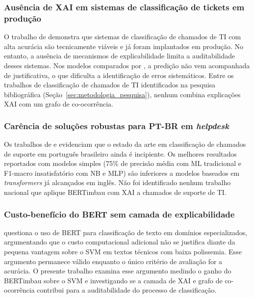 \documentclass[
    12pt,                %
    openright,           %
    oneside,             %
    a4paper,             %
    english,             %
    brazil               %
]{abntex2}
\begin{document}
\subsubsection{Ausência de XAI em sistemas de classificação de tickets em produção}
\label{subsubsec:lacuna_xai}

O trabalho de  demonstra que sistemas de classificação de chamados de TI 
com alta acurácia são tecnicamente viáveis e já foram implantados em produção. No entanto, a 
ausência de mecanismos de explicabilidade limita a auditabilidade desses sistemas. 
Nos modelos comparados por , a predição não vem acompanhada de justificativa, o que dificulta a identificação de erros sistemáticos. Entre os trabalhos de classificação de chamados de TI identificados na pesquisa bibliográfica (Seção~\ref{sec:metodologia_pesquisa}), nenhum combina explicações XAI com um grafo de co-ocorrência.

\subsubsection{Carência de soluções robustas para PT-BR em \textit{helpdesk}}
\label{subsubsec:lacuna_ptbr}

Os trabalhos de  e  evidenciam que o estado da arte em classificação de chamados de suporte em português brasileiro ainda é incipiente. Os melhores resultados reportados com modelos simples (75\% de precisão média com ML tradicional e F1-macro insatisfatório com NB e MLP) são inferiores a modelos baseados em \textit{transformers} já alcançados em inglês. Não foi identificado nenhum trabalho nacional que aplique BERTimbau com XAI a chamados de suporte de TI.

\subsubsection{Custo-benefício do BERT sem camada de explicabilidade}
\label{subsubsec:lacuna_wahba}

 questiona o uso de BERT para classificação de texto em domínios especializados, 
argumentando que o custo computacional adicional não se justifica diante da pequena vantagem sobre 
o SVM em textos técnicos com baixa polissemia. Esse argumento permanece válido enquanto o único critério 
de avaliação for a acurácia. O presente trabalho examina esse argumento medindo o ganho do BERTimbau sobre o SVM e investigando se a camada de XAI e grafo de co-ocorrência contribui para a auditabilidade do processo de classificação.
\end{document}
